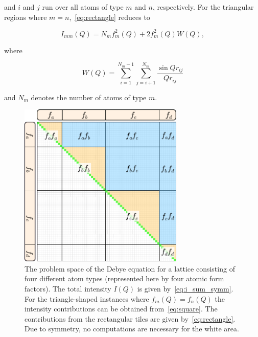 \documentclass[11pt,twoside]{report}
\begin{document}
\noindent and $i$ and $j$ run over all atoms of type $m$ and $n$, respectively. For the triangular regions where $m = n$,~\cref{eq:rectangle} reduces to

\begin{equation}
I_{mm}(Q) = N_{m}f_{m}^{2}(Q) + 2f_{m}^{2}(Q)W(Q),
\label{eq:square}
\end{equation} 

\noindent where

\begin{equation}
W(Q) = \sum_{i=1}^{N_{m}-1}\sum_{j=i+1}^{N_{m}} \frac{\sin{Qr_{ij}}}{Qr_{ij}} 
\label{eq:square_inner}
\end{equation} 

\noindent and $N_{m}$ denotes the number of atoms of type $m$. 

\begin{figure}[htbp]
	\begin{center}
		\includegraphics[width=0.7\textwidth]{img/calculation_structure.pdf}	
	\end{center}
	\caption{The problem space of the Debye equation for a lattice consisting of four different atom types (represented here by four atomic form factors). The total intensity $I(Q)$ is given by~\cref{eq:i_sum_symm}. For the triangle-shaped instances where $f_{m}(Q) = f_{n}(Q)$ the intensity contributions can be obtained from~\cref{eq:square}. The contributions from the rectangular tiles are given by~\cref{eq:rectangle}. Due to symmetry, no computations are necessary for the white area.\label{fig:problem_space}}
\end{figure}
\end{document}
